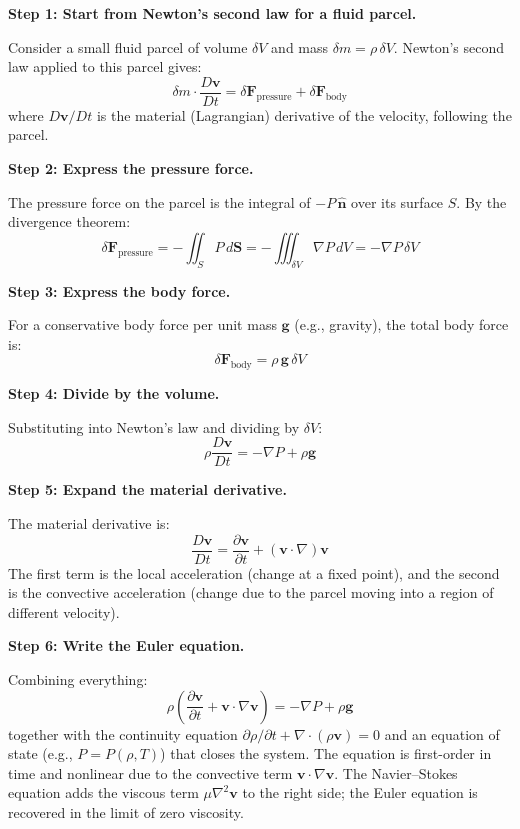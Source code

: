 \textbf{Step 1: Start from Newton's second law for a fluid parcel.}

Consider a small fluid parcel of volume $\delta V$ and mass $\delta m = \rho\,\delta V$. Newton's second law applied to this parcel gives:
\begin{equation}
\delta m \cdot \frac{D\mathbf{v}}{Dt} = \delta\mathbf{F}_{\text{pressure}} + \delta\mathbf{F}_{\text{body}}
\end{equation}
where $D\mathbf{v}/Dt$ is the material (Lagrangian) derivative of the velocity, following the parcel.

\textbf{Step 2: Express the pressure force.}

The pressure force on the parcel is the integral of $-P\,\hat{\mathbf{n}}$ over its surface $S$. By the divergence theorem:
\begin{equation}
\delta\mathbf{F}_{\text{pressure}} = -\iint_S P\,d\mathbf{S} = -\iiint_{\delta V}\nabla P\,dV = -\nabla P\,\delta V
\end{equation}

\textbf{Step 3: Express the body force.}

For a conservative body force per unit mass $\mathbf{g}$ (e.g., gravity), the total body force is:
\begin{equation}
\delta\mathbf{F}_{\text{body}} = \rho\,\mathbf{g}\,\delta V
\end{equation}

\textbf{Step 4: Divide by the volume.}

Substituting into Newton's law and dividing by $\delta V$:
\begin{equation}
\rho\frac{D\mathbf{v}}{Dt} = -\nabla P + \rho\mathbf{g}
\end{equation}

\textbf{Step 5: Expand the material derivative.}

The material derivative is:
\begin{equation}
\frac{D\mathbf{v}}{Dt} = \frac{\partial \mathbf{v}}{\partial t} + (\mathbf{v} \cdot \nabla)\mathbf{v}
\end{equation}
The first term is the local acceleration (change at a fixed point), and the second is the convective acceleration (change due to the parcel moving into a region of different velocity).

\textbf{Step 6: Write the Euler equation.}

Combining everything:
\begin{equation}
\boxed{\rho\left(\frac{\partial \mathbf{v}}{\partial t} + \mathbf{v}\cdot\nabla\mathbf{v}\right) = -\nabla P + \rho\mathbf{g}}
\end{equation}
together with the continuity equation $\partial\rho/\partial t + \nabla\cdot(\rho\mathbf{v}) = 0$ and an equation of state (e.g., $P = P(\rho, T)$) that closes the system. The equation is first-order in time and nonlinear due to the convective term $\mathbf{v}\cdot\nabla\mathbf{v}$. The Navier--Stokes equation adds the viscous term $\mu\nabla^2\mathbf{v}$ to the right side; the Euler equation is recovered in the limit of zero viscosity.

